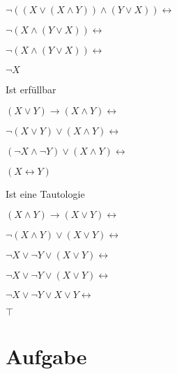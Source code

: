 \documentclass[11pt]{amsart}
\begin{document}
$
\lnot ((X \lor (X \land Y)) \land (Y \lor X)) \leftrightarrow
$

$
\lnot (X \land (Y \lor X)) \leftrightarrow
$

$
\lnot (X \land (Y \lor X)) \leftrightarrow
$

$
\lnot X
$

Ist erfüllbar

$
(X \lor Y) \to (X \land Y) \leftrightarrow
$

$
\lnot(X \lor Y) \lor (X \land Y) \leftrightarrow
$

$
(\lnot X \land \lnot Y) \lor (X \land Y) \leftrightarrow
$

$
(X \leftrightarrow Y)
$

Ist eine Tautologie

$
(X \land Y ) \to (X \lor Y) \leftrightarrow
$

$
\lnot (X \land Y ) \lor (X \lor Y) \leftrightarrow
$

$
\lnot X \lor \lnot Y \lor (X \lor Y) \leftrightarrow
$

$
\lnot X \lor \lnot Y \lor (X \lor Y) \leftrightarrow
$

$
\lnot X \lor \lnot Y \lor X \lor Y \leftrightarrow
$

$
\top
$

\section{Aufgabe}
\end{document}

